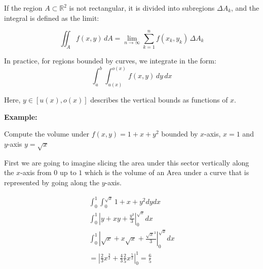 If the region \( A \subset \mathbb{R}^2 \) is not rectangular, it is divided into subregions \( \Delta A_k \), and the integral is defined as the limit:

\[
\iint_A f(x, y)\, dA = \lim_{n \to \infty} \sum_{k=1}^n f(x_k, y_k) \, \Delta A_k
\]

In practice, for regions bounded by curves, we integrate in the form:
\[
\int_a^b \int_{u(x)}^{o(x)} f(x, y)\, dy\, dx
\]

Here, \( y \in [u(x), o(x)] \) describes the vertical bounds as functions of \( x \).
\vspace{\baselineskip}

\textbf{Example:}
\vspace{\baselineskip}

Compute the volume under \(f(x,y) = 1 + x + y^2\) bounded by \(x\)-axis, \(x = 1\) and \(y\)-axis \(y = \sqrt{x}\)

\begin{center}
\end{center}

First we are going to imagine slicing the area under this sector vertically along the \(x\)-axis from \(0\) up to \(1\) which
is the volume of an Area under a curve that is represented by going along the \(y\)-axis.

\begin{align*}
    \int_{0}^{1}\int_{0}^{\sqrt{x}} 1 + x + y^2 dy dx \\
    \int_{0}^{1} \left| y + xy + \frac{y^3}{3} \right|_{0}^{\sqrt{x}} dx \\
    \int_{0}^{1} \left| \sqrt{x} + x\sqrt{x} + \frac{\sqrt{x}^3}{3} \right|_{0}^{\sqrt{x}} dx \\
    = \left| \frac{2}{3} x^{\frac{3}{2}} + \frac{4}{3} \frac{2}{5} x^{\frac{5}{2}} \right|_{0}^{1} = \frac{6}{5}
\end{align*}

